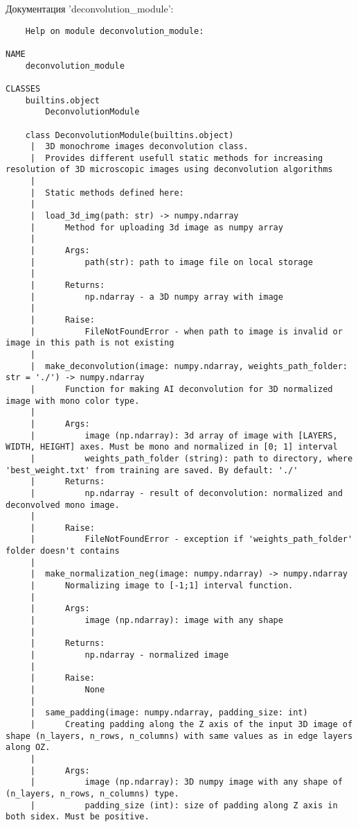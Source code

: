 Документация 'deconvolution\_module':
\begin{lstlisting}
	Help on module deconvolution_module:

NAME
    deconvolution_module

CLASSES
    builtins.object
        DeconvolutionModule
    
    class DeconvolutionModule(builtins.object)
     |  3D monochrome images deconvolution class.
     |  Provides different usefull static methods for increasing resolution of 3D microscopic images using deconvolution algorithms
     |  
     |  Static methods defined here:
     |  
     |  load_3d_img(path: str) -> numpy.ndarray
     |      Method for uploading 3d image as numpy array
     |      
     |      Args:
     |          path(str): path to image file on local storage
     |      
     |      Returns:
     |          np.ndarray - a 3D numpy array with image
     |      
     |      Raise:
     |          FileNotFoundError - when path to image is invalid or image in this path is not existing
     |  
     |  make_deconvolution(image: numpy.ndarray, weights_path_folder: str = './') -> numpy.ndarray
     |      Function for making AI deconvolution for 3D normalized image with mono color type.
     |      
     |      Args:
     |          image (np.ndarray): 3d array of image with [LAYERS, WIDTH, HEIGHT] axes. Must be mono and normalized in [0; 1] interval
     |          weights_path_folder (string): path to directory, where 'best_weight.txt' from training are saved. By default: './'
     |      Returns:
     |          np.ndarray - result of deconvolution: normalized and deconvolved mono image.
     |      
     |      Raise:
     |          FileNotFoundError - exception if 'weights_path_folder' folder doesn't contains
     |  
     |  make_normalization_neg(image: numpy.ndarray) -> numpy.ndarray
     |      Normalizing image to [-1;1] interval function.
     |      
     |      Args:
     |          image (np.ndarray): image with any shape
     |      
     |      Returns:
     |          np.ndarray - normalized image
     |      
     |      Raise:
     |          None
     |  
     |  same_padding(image: numpy.ndarray, padding_size: int)
     |      Creating padding along the Z axis of the input 3D image of shape (n_layers, n_rows, n_columns) with same values as in edge layers along OZ.
     |      
     |      Args:
     |          image (np.ndarray): 3D numpy image with any shape of (n_layers, n_rows, n_columns) type.
     |          padding_size (int): size of padding along Z axis in both sidex. Must be positive.

\end{lstlisting}
